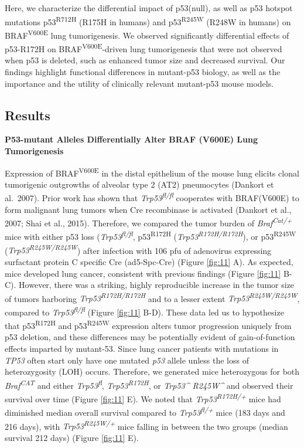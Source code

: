 Here, we characterize the differential impact of p53(null), as well as p53 hotspot mutations p53\textsuperscript{R712H} (R175H in humans) and p53\textsuperscript{R245W} (R248W in humans) on BRAF\textsuperscript{V600E} lung tumorigenesis. We observed significantly differential effects of p53-R172H on BRAF\textsuperscript{V600E}-driven lung tumorigenesis that were not observed when p53 is deleted, such as enhanced tumor size and decreased survival. Our findings highlight functional differences in mutant-p53 biology, as well as the importance and the utility of clinically relevant mutant-p53 mouse models.

\hypertarget{results-1}{%
\subsection{Results}\label{results-1}}

\textbf{P53-mutant Alleles Differentially Alter BRAF (V600E) Lung Tumorigenesis}

Expression of BRAF\textsuperscript{V600E} in the distal epithelium of the mouse lung elicits clonal tumorigenic outgrowths of alveolar type 2 (AT2) pneumocytes (Dankort et al.~2007). Prior work has shown that \emph{Trp53\textsuperscript{fl/fl}} cooperates with BRAF(V600E) to form malignant lung tumors when Cre recombinase is activated (Dankort et al., 2007; Shai et al., 2015). Therefore, we compared the tumor burden of \emph{Braf\textsuperscript{Cat/+}} mice with either p53 loss (\emph{Trp53\textsuperscript{fl/fl}}, p53\textsuperscript{R172H} (\emph{Trp53\textsuperscript{R172H/R172H}}), or p53\textsuperscript{R245W} (\emph{Trp53\textsuperscript{R245W/R245W}}) after infection with 106 pfu of adenovirus expressing surfactant protein C specific Cre (ad5-Spc-Cre) (Figure \ref{fig:11} A). As expected, mice developed lung cancer, consistent with previous findings (Figure \ref{fig:11} B-C). However, there was a striking, highly reproducible increase in the tumor size of tumors harboring \emph{Trp53\textsuperscript{R172H/R172H}} and to a lesser extent \emph{Trp53\textsuperscript{R245W/R245W}}, compared to \emph{Trp53\textsuperscript{fl/fl}} (Figure \ref{fig:11} B-D). These data led us to hypothesize that p53\textsuperscript{R172H} and p53\textsuperscript{R245W} expression alters tumor progression uniquely from p53 deletion, and these differences may be potentially evident of gain-of-function effects imparted by mutant-53. Since lung cancer patients with mutations in \emph{TP53} often start only have one mutated \emph{p53} allele unless the loss of heterozygosity (LOH) occurs. Therefore, we generated mice heterozygous for both \emph{Braf\textsuperscript{CAT}} and either \emph{Trp53\textsuperscript{fl}}, \emph{Trp53\textsuperscript{R172H}}, or \emph{Trp53\^{} R245W\^{}} and observed their survival over time (Figure \ref{fig:11} E). We noted that \emph{Trp53\textsuperscript{R172H/+}} mice had diminished median overall survival compared to \emph{Trp53\textsuperscript{fl/+}} mice (183 days and 216 days), with \emph{Trp53\textsuperscript{R245W/+}} mice falling in between the two groups (median survival 212 days) (Figure \ref{fig:11} E).

